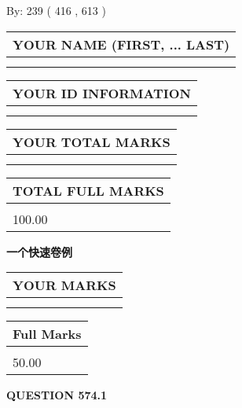 \documentclass{ctexart}
\begin{document}
   
\hspace{1.0in} By: 
 239 ( 416 ,  613 )
   
   
   
   
\newpage 
\setcounter{page}{ 
   574001 } 
   
   
   
   
\noindent\begin{tabular}{|l|}
\hline
YOUR NAME (FIRST, ... LAST)  \\
\hline
 \\ 
 \\ 
\hline
\end{tabular}
\hspace{0.05in} \begin{tabular}{|l|}
\hline
 YOUR   ID   INFORMATION  \\
\hline
 \\ 
 \\ 
\hline
\end{tabular}
   
   
\vspace{0.2in}\noindent\begin{tabular}{|l|}
\hline
YOUR TOTAL MARKS  \\
\hline
 \\ 
 \\ 
\hline
\end{tabular}
\hspace{0.05in} \begin{tabular}{|l|}
\hline
TOTAL FULL MARKS  \\
\hline
 \\ 
100.00 \\
\hline
\end{tabular}
   
   
 \vspace{0.2in}
{\LARGE {\textbf{ 一个快速卷例}}}
   
   
  
\vspace{0.2in}
  
\noindent\begin{tabular}{|l|}
\hline
 YOUR MARKS  \\
\hline
 \\ 
 \\ 
\hline
\end{tabular}
\hspace{0.05in} \begin{tabular}{|l|}
\hline
 Full Marks  \\
\hline
 \\ 
50.00 \\
\hline
\end{tabular}
{\textbf{\Large{QUESTION
574.1 
}}}
  
\end{document}
